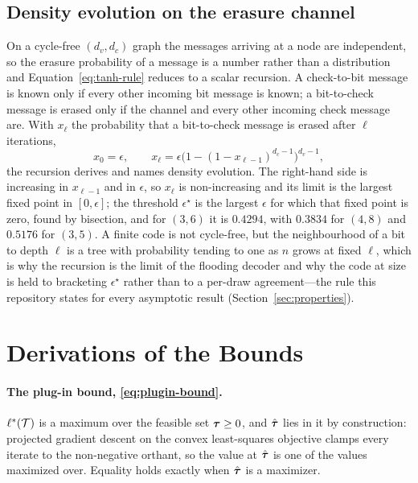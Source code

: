 \documentclass[11pt,a4paper]{article}
\begin{document}
\subsection{Density evolution on the erasure channel}
\label{app:density-evolution}
On a cycle-free $(d_v, d_c)$ graph the messages arriving at a node are
independent, so the erasure probability of a message is a number rather than
a distribution and Equation~\ref{eq:tanh-rule} reduces to a scalar
recursion. A check-to-bit message is known only if every other incoming
bit message is known; a bit-to-check message is erased only if the channel
and every other incoming check message are. With $x_\ell$ the probability
that a bit-to-check message is erased after $\ell$ iterations,
\begin{equation}
  x_0 = \epsilon,
  \qquad
  x_\ell = \epsilon \big( 1 - (1 - x_{\ell-1})^{d_c - 1} \big)^{d_v - 1},
  \label{eq:density-evolution}
\end{equation}
the recursion \citet[Sec.~3.12]{richardson2008} derives and names density
evolution. The right-hand side is increasing in $x_{\ell-1}$ and in
$\epsilon$, so $x_\ell$ is non-increasing and its limit is the largest fixed
point in $[0, \epsilon]$; the threshold $\epsilon^\star$ is the largest
$\epsilon$ for which that fixed point is zero, found by bisection, and for
$(3,6)$ it is $0.4294$, with $0.3834$ for $(4,8)$ and $0.5176$ for
$(3,5)$. A finite code is not cycle-free, but the neighbourhood of a bit to
depth $\ell$ is a tree with probability tending to one as $n$ grows at
fixed $\ell$, which is why the recursion is the limit of the flooding
decoder and why the code at size is held to bracketing $\epsilon^\star$
rather than to a per-draw agreement---the rule this repository states for
every asymptotic result (Section~\ref{sec:properties}).

\section{Derivations of the Bounds}
\label{app:bounds}

\paragraph{The plug-in bound, \eqref{eq:plugin-bound}.}
$\ell^\ast(\mathcal{T})$ is a maximum over the feasible set $\boldsymbol{\tau} \ge 0$, and
$\hat{\boldsymbol{\tau}}$ lies in it by construction: projected gradient descent on the
convex least-squares objective clamps every iterate to the non-negative
orthant, so the value at $\hat{\boldsymbol{\tau}}$ is one of the values maximized over.
Equality holds exactly when $\hat{\boldsymbol{\tau}}$ is a maximizer.
\end{document}
